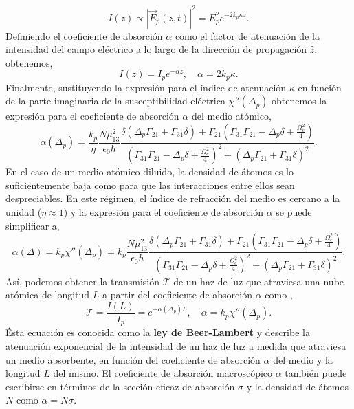 \begin{equation}
    I(z) \propto |\vec{E}_p(z,t)|^2 = E_p^2 e^{- 2 k_p \kappa z}.
\end{equation}
Definiendo el coeficiente de absorción $\alpha$ como el factor de atenuación de la intensidad del campo eléctrico a lo largo de la dirección de propagación $\hat{z}$, obtenemos,   
\begin{equation}
    I(z) = I_p e^{-\alpha z}, \quad \alpha = 2 k_p \kappa.
\end{equation}
Finalmente, sustituyendo la expresión para el índice de atenuación $\kappa$ en función de la parte imaginaria de la susceptibilidad eléctrica $\chi''(\Delta_p)$ obtenemos la expresión para el coeficiente de absorción $\alpha$ del medio atómico,
\begin{equation}
        \alpha(\Delta_p) = \frac{k_p} {\eta} \frac{N \mu_{13}^2}{\epsilon_0 \hbar}\frac{\delta \left( \Delta_p\Gamma_{21} + \Gamma_{31}\delta \right) + \Gamma_{21} \left(\Gamma_{31}\Gamma_{21} - \Delta_p\delta + \frac{\Omega_c^2}{4} \right)}{\left( \Gamma_{31}\Gamma_{21} - \Delta_p\delta + \frac{\Omega_c^2}{4} \right)^2 + \left(\Delta_p\Gamma_{21} + \Gamma_{31}\delta\right)^2}.
\end{equation}
En el caso de un medio atómico diluido, la densidad de átomos es lo suficientemente baja como para que las interacciones entre ellos sean despreciables. En este régimen, el índice de refracción del medio es cercano a la unidad ($\eta \approx 1$) y la expresión para el coeficiente de absorción $\alpha$ se puede simplificar a,
\begin{equation}
    \alpha(\Delta) = k_p \chi''(\Delta_p) = k_p \frac{N \mu_{13}^2}{\epsilon_0 \hbar}\frac{\delta \left( \Delta_p\Gamma_{21} + \Gamma_{31}\delta \right) + \Gamma_{21} \left(\Gamma_{31}\Gamma_{21} - \Delta_p\delta + \frac{\Omega_c^2}{4} \right)}{\left( \Gamma_{31}\Gamma_{21} - \Delta_p\delta + \frac{\Omega_c^2}{4} \right)^2 + \left(\Delta_p\Gamma_{21} + \Gamma_{31}\delta\right)^2}.
\end{equation}
Así, podemos obtener la transmisión $\mathscr{T}$ de un haz de luz que atraviesa una nube atómica de longitud $L$ a partir del coeficiente de absorción $\alpha$ como \cite{demtroderLaserSpectroscopy1996,gea-banaclocheElectromagneticallyInducedTransparency1995}, 
\begin{equation}
    \boxed{
        \mathscr{T} = \frac{I(L)}{I_p} =  e^{-\alpha(\Delta_p) L}, \quad \alpha = k_p \chi''(\Delta_p).
    }
\end{equation}
Ésta ecuación es conocida como la \textbf{ley de Beer-Lambert} y describe la atenuación exponencial de la intensidad de un haz de luz a medida que atraviesa un medio absorbente, en función del coeficiente de absorción $\alpha$ del medio y la longitud $L$ del mismo. El coeficiente de absorción macroscópico $\alpha$ también puede escribirse en términos de la sección eficaz de absorción $\sigma$ y la densidad de átomos $N$ como $\alpha = N \sigma$. 

